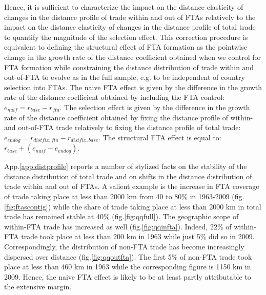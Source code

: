 \documentclass[12pt,twoside,a4paper,notitlepage]{article}
\begin{document}
Hence, it is sufficient to characterize the impact on the distance elasticity of changes in the distance profile of trade within and out of FTAs relatively to the impact on the distance elasticity of changes in the distance profile of total trade to quantify the magnitude of the selection effect. 
This correction procedure is equivalent to defining the structural effect of FTA formation as the pointwise change in the growth rate of the distance coefficient obtained when we control for FTA formation while constraining the distance distribution of trade within and out-of-FTA to evolve as in the full sample, e.g. to be independent of country selection into FTAs. The naive FTA effect is given by the difference in the growth rate of the distance coefficient obtained by including the FTA control: $e_{naif}=r_{base}-r_{fta}$. The selection effect is given by the difference in the growth rate of the distance coefficient obtained by fixing the distance profile of within- and out-of-FTA trade relatively to fixing the distance profile of total trade: $e_{endog}=r_{distfix,fta}-r_{distfix,base}$. The structural FTA effect is equal to: $r_{base}+(e_{naif}-e_{endog})$. 

App.\ref{app:distprofile} reports a number of stylized facts on the stability of the distance distribution of total trade and on shifts in the distance distribution of trade within and out of FTAs. A salient example is the increase in FTA coverage of trade taking place at less than 2000 km from 40 to 80\% in 1963-2009 (fig.\ref{fig:ftascontig}) while the share of trade taking place at less than 2000 km in total trade has remained stable at 40\% (fig.\ref{fig:qqfull}). The geographic scope of within-FTA trade has increased as well (fig.\ref{fig:qqinfta}). Indeed, 22\% of within-FTA trade took place at less than 200 km in 1963 while just 5\% did so in 2009. Correspondingly, the distribution of non-FTA trade has become increasingly dispersed over distance (fig.\ref{fig:qqoutfta}). The first 5\% of non-FTA trade took place at less than 460 km in 1963 while the corresponding figure is 1150 km in 2009. Hence, the naive FTA effect is likely to be at least partly attributable to the extensive margin.  
\end{document}
